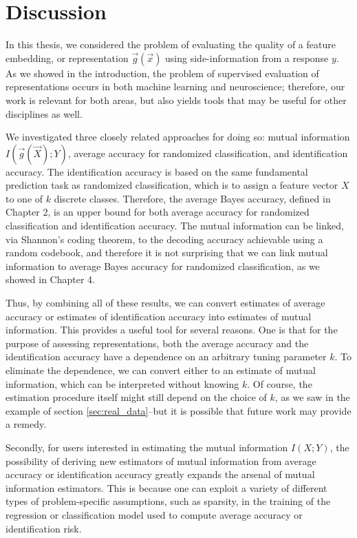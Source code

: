 
\chapter{Discussion} %

\label{Chapter6} %

In this thesis, we considered the problem of evaluating the quality of
a feature embedding, or representation $\vec{g}(\vec{x})$ using
side-information from a response $y$.  As we showed in the
introduction, the problem of supervised evaluation of representations
occurs in both machine learning and neuroscience; therefore, our work
is relevant for both areas, but also yields tools that may be useful
for other disciplines as well.

We investigated three closely related approaches for doing so: mutual
information $I(\vec{g}(\vec{X}); Y)$, average accuracy for randomized
classification, and identification accuracy.  The identification
accuracy is based on the same fundamental prediction task as
randomized classification, which is to assign a feature vector $X$ to
one of $k$ discrete classes.  Therefore, the average Bayes accuracy,
defined in Chapter 2, is an upper bound for both average accuracy for
randomized classification and identification accuracy.  The mutual
information can be linked, via Shannon's coding theorem, to the
decoding accuracy achievable using a random codebook, and therefore it
is not surprising that we can link mutual information to average Bayes
accuracy for randomized classification, as we showed in Chapter 4.

Thus, by combining all of these results, we can convert estimates of
average accuracy or estimates of identification accuracy into
estimates of mutual information.  This provides a useful tool for
several reasons.  One is that for the purpose of assessing
representations, both the average accuracy and the identification
accuracy have a dependence on an arbitrary tuning parameter $k$.  To
eliminate the dependence, we can convert either to an estimate of
mutual information, which can be interpreted without knowing $k$.  Of
course, the estimation procedure itself might still depend on the
choice of $k$, as we saw in the example of section
\ref{sec:real_data}--but it is possible that future work may provide a
remedy.

Secondly, for users interested in estimating the mutual information
$I(X; Y)$, the possibility of deriving new estimators of mutual
information from average accuracy or identification accuracy greatly
expands the arsenal of mutual information estimators.  This is because
one can exploit a variety of different types of problem-specific
assumptions, such as sparsity, in the training of the regression or
classification model used to compute average accuracy or
identification risk.

